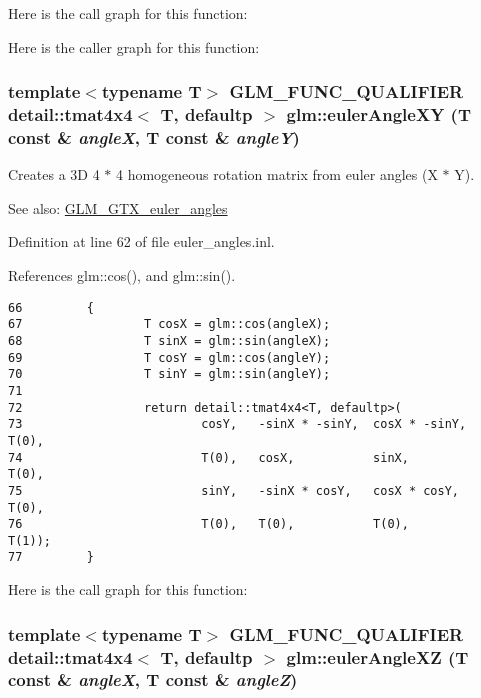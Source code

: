 Here is the call graph for this function:

Here is the caller graph for this function:\hypertarget{group__gtx__euler__angles_g6a2dc9bf80aecdffb3e5ab3bcede6647}{
\subsubsection[eulerAngleXY]{\setlength{\rightskip}{0pt plus 5cm}template$<$typename T$>$ GLM\_\-FUNC\_\-QUALIFIER detail::tmat4x4$<$ T, defaultp $>$ glm::eulerAngleXY (T const \& {\em angleX}, \/  T const \& {\em angleY})}}
\label{group__gtx__euler__angles_g6a2dc9bf80aecdffb3e5ab3bcede6647}


Creates a 3D 4 $\ast$ 4 homogeneous rotation matrix from euler angles (X $\ast$ Y). \begin{Desc}
\item[See also:]\hyperlink{group__gtx__euler__angles}{GLM\_\-GTX\_\-euler\_\-angles} \end{Desc}


Definition at line 62 of file euler\_\-angles.inl.

References glm::cos(), and glm::sin().

\begin{Code}\begin{verbatim}66         {
67                 T cosX = glm::cos(angleX);
68                 T sinX = glm::sin(angleX);
69                 T cosY = glm::cos(angleY);
70                 T sinY = glm::sin(angleY);
71 
72                 return detail::tmat4x4<T, defaultp>(
73                         cosY,   -sinX * -sinY,  cosX * -sinY,   T(0),
74                         T(0),   cosX,           sinX,           T(0),
75                         sinY,   -sinX * cosY,   cosX * cosY,    T(0),
76                         T(0),   T(0),           T(0),           T(1));
77         }
\end{verbatim}
\end{Code}




Here is the call graph for this function:\hypertarget{group__gtx__euler__angles_g9b63e52fda0b7773c50bbf3c310bdcf2}{
\subsubsection[eulerAngleXZ]{\setlength{\rightskip}{0pt plus 5cm}template$<$typename T$>$ GLM\_\-FUNC\_\-QUALIFIER detail::tmat4x4$<$ T, defaultp $>$ glm::eulerAngleXZ (T const \& {\em angleX}, \/  T const \& {\em angleZ})}}
\label{group__gtx__euler__angles_g9b63e52fda0b7773c50bbf3c310bdcf2}


